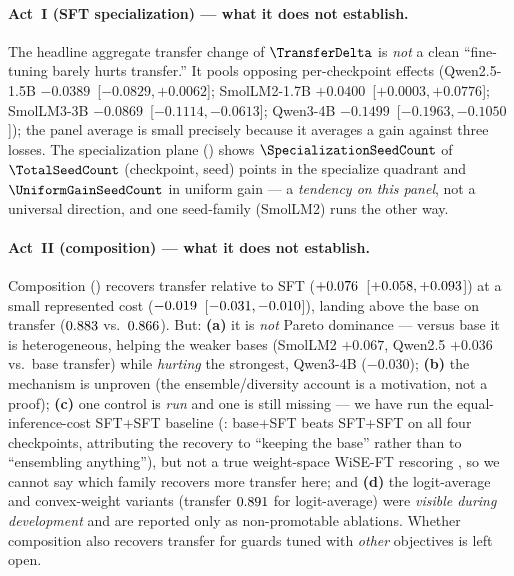 \paragraph{Act~I (SFT specialization) --- what it does not establish.} The headline aggregate transfer change of $\TransferDelta$ is \emph{not} a clean ``fine-tuning barely hurts transfer.'' It pools opposing per-checkpoint effects (Qwen2.5-1.5B $-0.0389$~[$-0.0829,+0.0062$]; SmolLM2-1.7B $+0.0400$~[$+0.0003,+0.0776$]; SmolLM3-3B $-0.0869$~[$-0.1114,-0.0613$]; Qwen3-4B $-0.1499$~[$-0.1963,-0.1050$]); the panel average is small precisely because it averages a gain against three losses. The specialization plane () shows $\SpecializationSeedCount$ of $\TotalSeedCount$ (checkpoint, seed) points in the specialize quadrant and $\UniformGainSeedCount$ in uniform gain --- a \emph{tendency on this panel}, not a universal direction, and one seed-family (SmolLM2) runs the other way.

\paragraph{Act~II (composition) --- what it does not establish.} Composition () recovers transfer relative to SFT ($+0.076$~[$+0.058,+0.093$]) at a small represented cost ($-0.019$~[$-0.031,-0.010$]), landing above the base on transfer ($0.883$ vs.\ $0.866$). But: \textbf{(a)} it is \emph{not} Pareto dominance --- versus base it is heterogeneous, helping the weaker bases (SmolLM2 $+0.067$, Qwen2.5 $+0.036$ vs.\ base transfer) while \emph{hurting} the strongest, Qwen3-4B ($-0.030$); \textbf{(b)} the mechanism is unproven (the ensemble/diversity account is a motivation, not a proof); \textbf{(c)} one control is \emph{run} and one is still missing --- we have run the equal-inference-cost SFT+SFT baseline (: base+SFT beats SFT+SFT on all four checkpoints, attributing the recovery to ``keeping the base'' rather than to ``ensembling anything''), but not a true weight-space WiSE-FT rescoring \citep{wortsman2022wiseft}, so we cannot say which family recovers more transfer here; and \textbf{(d)} the logit-average and convex-weight variants (transfer $0.891$ for logit-average) were \emph{visible during development} and are reported only as non-promotable ablations. Whether composition also recovers transfer for guards tuned with \emph{other} objectives is left open.

